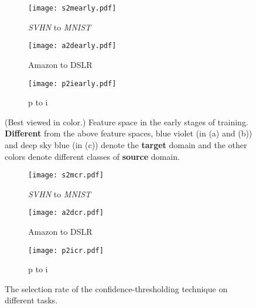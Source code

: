 \documentclass[10pt,twocolumn,letterpaper]{article}
\begin{document}
\begin{figure}[t]

\centering
\begin{subfigure}{0.2\textwidth}
  \centering
  \texttt{[image: s2mearly.pdf]}\vspace{-0.1cm}
  \caption{\emph{SVHN} to \emph{MNIST}}
  \label{afig:7-1}
\end{subfigure}
\begin{subfigure}{0.2\textwidth}
  \centering
  \texttt{[image: a2dearly.pdf]}\vspace{-0.1cm}
  \caption{Amazon to DSLR}
  \label{afig:7-2}
\end{subfigure}
\begin{subfigure}{0.2\textwidth}
  \centering
  \texttt{[image: p2iearly.pdf]}\vspace{-0.1cm}
  \caption{p to i}
  \label{afig:7-3}
\end{subfigure}
\vspace{-0.2cm}
\caption{(Best viewed in color.) Feature space in the early stages of training. \textbf{Different} from the above feature spaces, blue violet (in (a) and (b)) and deep sky blue (in (c)) denote the \textbf{target} domain and the other colors denote different classes of \textbf{source} domain.}
\label{afig:7}
\end{figure}

\begin{figure}[t]

\centering
\begin{subfigure}{0.2\textwidth}
  \centering
  \texttt{[image: s2mcr.pdf]}\vspace{-0.1cm}
  \caption{\emph{SVHN} to \emph{MNIST}}
  \label{afig:6-1}
\end{subfigure}
\begin{subfigure}{0.2\textwidth}
  \centering
  \texttt{[image: a2dcr.pdf]}\vspace{-0.1cm}
  \caption{Amazon to DSLR}
  \label{afig:6-2}
\end{subfigure}
\begin{subfigure}{0.2\textwidth}
  \centering
  \texttt{[image: p2icr.pdf]}\vspace{-0.1cm}
  \caption{p to i}
  \label{afig:6-3}
\end{subfigure}
\vspace{-0.2cm}
\caption{The selection rate of the confidence-thresholding technique on different tasks.}
\label{afig:6}
\end{figure}
\end{document}
